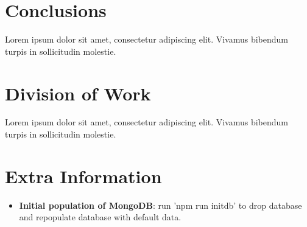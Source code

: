 \documentclass[11pt, a4paper]{article}
\begin{document}
\section{Conclusions}
Lorem ipsum dolor sit amet, consectetur adipiscing elit. Vivamus bibendum turpis in sollicitudin
molestie.

\section{Division of Work}
Lorem ipsum dolor sit amet, consectetur adipiscing elit. Vivamus bibendum turpis in sollicitudin
molestie.

\section{Extra Information}
\begin{itemize}
  \item \textbf{Initial population of MongoDB}: run 'npm run initdb' to drop database and
  repopulate database with default data.
\end{itemize}
\end{document}
